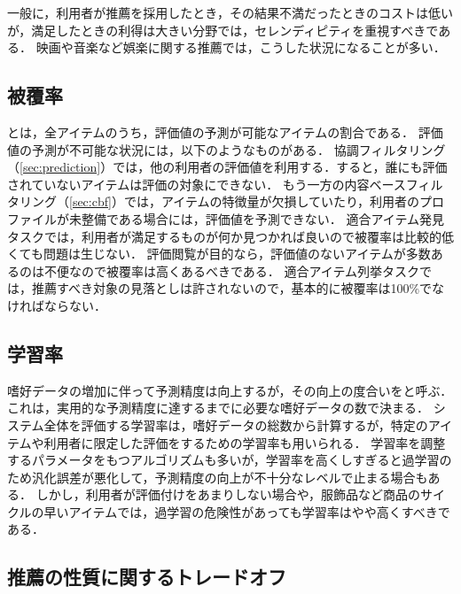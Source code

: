 一般に，利用者が推薦を採用したとき，その結果不満だったときのコストは低いが，満足したときの利得は大きい分野では，セレンディピティを重視すべきである．
映画や音楽など娯楽に関する推薦では，こうした状況になることが多い．

\subsection{被覆率}

とは，全アイテムのうち，評価値の予測が可能なアイテムの割合である．
評価値の予測が不可能な状況には，以下のようなものがある．
協調フィルタリング（\ref{sec:prediction}）では，他の利用者の評価値を利用する．すると，誰にも評価されていないアイテムは評価の対象にできない．
もう一方の内容ベースフィルタリング（\ref{sec:cbf}）では，アイテムの特徴量が欠損していたり，利用者のプロファイルが未整備である場合には，評価値を予測できない．
適合アイテム発見タスクでは，利用者が満足するものが何か見つかれば良いので被覆率は比較的低くても問題は生じない．
評価閲覧が目的なら，評価値のないアイテムが多数あるのは不便なので被覆率は高くあるべきである．
適合アイテム列挙タスクでは，推薦すべき対象の見落としは許されないので，基本的に被覆率は100\%でなければならない．

\subsection{学習率}

嗜好データの増加に伴って予測精度は向上するが，その向上の度合いをと呼ぶ．これは，実用的な予測精度に達するまでに必要な嗜好データの数で決まる．
システム全体を評価する学習率は，嗜好データの総数から計算するが，特定のアイテムや利用者に限定した評価をするための学習率も用いられる．
学習率を調整するパラメータをもつアルゴリズムも多いが，学習率を高くしすぎると過学習のため汎化誤差が悪化して，予測精度の向上が不十分なレベルで止まる場合もある．
しかし，利用者が評価付けをあまりしない場合や，服飾品など商品のサイクルの早いアイテムでは，過学習の危険性があっても学習率はやや高くすべきである．

\subsection{推薦の性質に関するトレードオフ}

